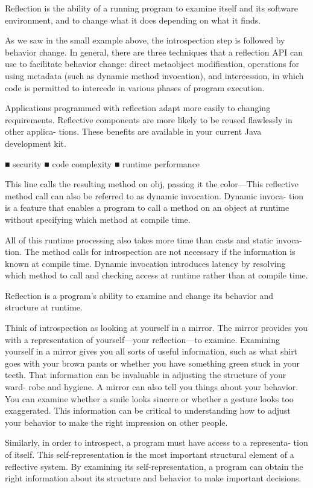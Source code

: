 \begin{itemize}
Reflection is the ability of a running program to examine itself and its software environment, and to change what it does depending on what it finds.

As we saw in the small example above, the introspection step is followed by behavior change. In general, there are three techniques that a reflection API can use to facilitate behavior change: direct metaobject modification, operations for using metadata (such as dynamic method invocation), and intercession, in which code is permitted to intercede in various phases of program execution.

Applications programmed with reflection adapt more easily to changing requirements. Reflective components are more likely to be reused flawlessly in other applica- tions. These benefits are available in your current Java development kit.


■ security
■ code complexity
■ runtime performance


This line calls the resulting method on obj, passing it the color—This reflective method call can also be referred to as dynamic invocation. Dynamic invoca- tion is a feature that enables a program to call a method on an object at runtime without specifying which method at compile time.

All of this runtime processing also takes more time than casts and static invoca- tion. The method calls for introspection are not necessary if the information is known at compile time. Dynamic invocation introduces latency by resolving which method to call and checking access at runtime rather than at compile time. 

Reflection is a program’s ability to examine and change its behavior and structure at runtime. 

Think of introspection as looking at yourself in a mirror. The mirror provides you with a representation of yourself—your reflection—to examine. Examining yourself in a mirror gives you all sorts of useful information, such as what shirt goes with your brown pants or whether you have something green stuck in your teeth. That information can be invaluable in adjusting the structure of your ward- robe and hygiene. A mirror can also tell you things about your behavior. You can examine whether a smile looks sincere or whether a gesture looks too exaggerated. This information can be critical to understanding how to adjust your behavior to make the right impression on other people.


Similarly, in order to introspect, a program must have access to a representa- tion of itself. This self-representation is the most important structural element of a reflective system. By examining its self-representation, a program can obtain the right information about its structure and behavior to make important decisions.


\end{itemize}

